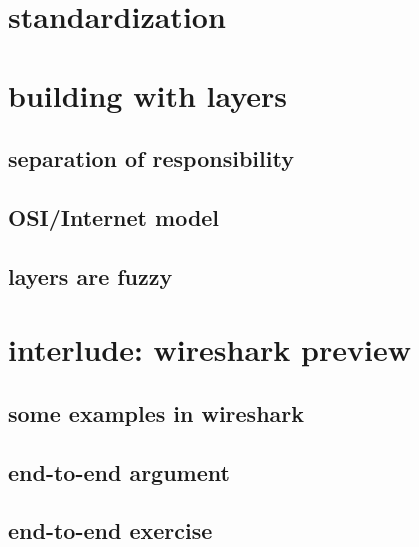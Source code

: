 \section{standardization}


\section{building with layers}

\subsection{separation of responsibility}



\subsection{OSI/Internet model}



\subsection{layers are fuzzy}



\section{interlude: wireshark preview}



\subsection{some examples in wireshark}


\subsection{end-to-end argument}


\subsection{end-to-end exercise}


